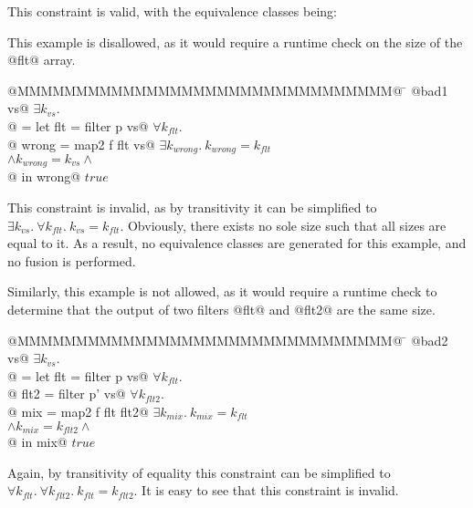 This constraint is valid, with the equivalence classes being:

This example is disallowed, as it would require a runtime check on the size of the @flt@ array.
\begin{tabbing}
@MMMMMMMMMMMMMMMMMMMMMMMMMMMMMMMM@  \= \kill
@bad1 vs@                           \> $\exists k_{vs}.$ \\
@ = let flt   = filter p vs@        \> $\forall k_{flt}.$ \\
@       wrong = map2   f flt vs@    \> $\exists k_{wrong}.\ k_{wrong} = k_{flt}$ \\
                                    \> $\wedge k_{wrong} = k_{vs} \wedge$ \\
@   in  wrong@                      \> $true$
\end{tabbing}
This constraint is invalid, as by transitivity it can be simplified to $\exists k_{vs}.\ \forall k_{flt}.\ k_{vs} = k_{flt}$.
Obviously, there exists no sole size such that all sizes are equal to it.
As a result, no equivalence classes are generated for this example, and no fusion is performed.


Similarly, this example is not allowed, as it would require a runtime check to determine that the output of two filters @flt@ and @flt2@ are the same size.
\begin{tabbing}
@MMMMMMMMMMMMMMMMMMMMMMMMMMMMMMMM@  \= \kill
@bad2 vs@                           \> $\exists k_{vs}.$ \\
@ = let flt  = filter p  vs@        \> $\forall k_{flt}.$ \\
@       flt2 = filter p' vs@        \> $\forall k_{flt2}.$ \\
@       mix  = map2   f  flt flt2@  \> $\exists k_{mix}.\ k_{mix} = k_{flt}$ \\
                                    \> $\wedge k_{mix} = k_{flt2} \wedge$ \\
@   in  mix@                        \> $true$                               \\
\end{tabbing}
Again, by transitivity of equality this constraint can be simplified to $\forall k_{flt}.\ \forall k_{flt2}.\ k_{flt} = k_{flt2}$.
It is easy to see that this constraint is invalid.

